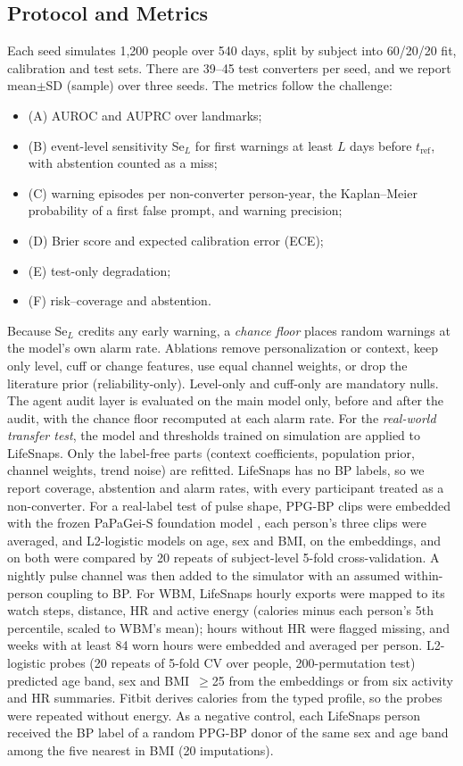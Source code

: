 \documentclass[conference]{IEEEtran}
\begin{document}
\subsection{Protocol and Metrics}
Each seed simulates 1,200 people over 540 days, split by subject into 60/20/20 fit, calibration and test sets. There are 39--45 test converters per seed, and we report mean$\pm$SD (sample) over three seeds. The metrics follow the challenge:
\begin{itemize}
\item (A) AUROC and AUPRC over landmarks;
\item (B) event-level sensitivity Se$_L$ for first warnings at least $L$ days before $t_{\mathrm{ref}}$, with abstention counted as a miss;
\item (C) warning episodes per non-converter person-year, the Kaplan--Meier probability of a first false prompt, and warning precision;
\item (D) Brier score and expected calibration error (ECE);
\item (E) test-only degradation;
\item (F) risk--coverage and abstention.
\end{itemize}
Because Se$_L$ credits any early warning, a \emph{chance floor} places random warnings at the model's own alarm rate. Ablations remove personalization or context, keep only level, cuff or change features, use equal channel weights, or drop the literature prior (reliability-only). Level-only and cuff-only are mandatory nulls. The agent audit layer is evaluated on the main model only, before and after the audit, with the chance floor recomputed at each alarm rate. For the \emph{real-world transfer test}, the model and thresholds trained on simulation are applied to LifeSnaps. Only the label-free parts (context coefficients, population prior, channel weights, trend noise) are refitted. LifeSnaps has no BP labels, so we report coverage, abstention and alarm rates, with every participant treated as a non-converter. For a real-label test of pulse shape, PPG-BP clips \cite{ppgbp2018} were embedded with the frozen PaPaGei-S foundation model \cite{papagei2025}, each person's three clips were averaged, and L2-logistic models on age, sex and BMI, on the embeddings, and on both were compared by 20 repeats of subject-level 5-fold cross-validation. A nightly pulse channel was then added to the simulator with an assumed within-person coupling to BP. For WBM, LifeSnaps hourly exports were mapped to its watch steps, distance, HR and active energy (calories minus each person's 5th percentile, scaled to WBM's mean); hours without HR were flagged missing, and weeks with at least 84 worn hours were embedded and averaged per person. L2-logistic probes (20 repeats of 5-fold CV over people, 200-permutation test) predicted age band, sex and BMI~$\geq$25 from the embeddings or from six activity and HR summaries. Fitbit derives calories from the typed profile, so the probes were repeated without energy. As a negative control, each LifeSnaps person received the BP label of a random PPG-BP donor of the same sex and age band among the five nearest in BMI (20 imputations).
\end{document}

